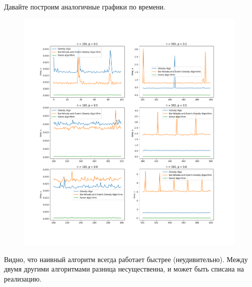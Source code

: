 \documentclass{article}
\theoremstyle{definition}
\begin{document}
  Давайте построим аналогичные графики по времени.
  \begin{figure}[H]
    \includegraphics[scale=0.4]{img/gnp_time_plots}
  \end{figure}
  Видно, что наивный алгоритм всегда работает быстрее (неудивительно). 
  Между двумя другими алгоритмами разница несущественна, и может быть списана на реализацию.
  
\end{document}
